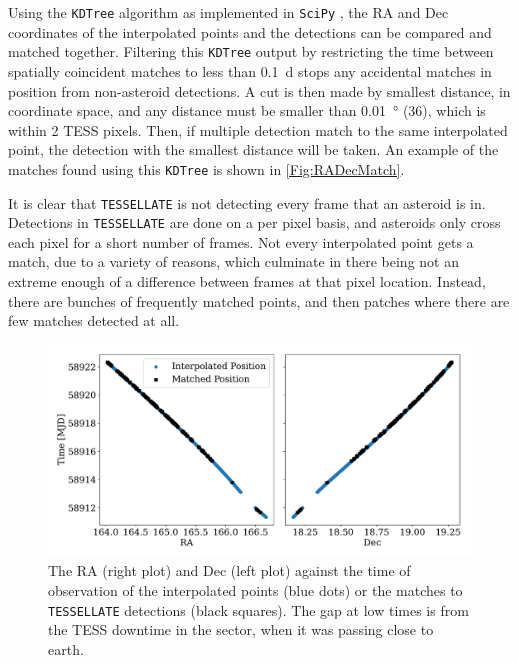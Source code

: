 \documentclass{UCreport}
\begin{document}
Using the \texttt{KDTree} algorithm \citep{Maneewongvatana1999} as implemented in \texttt{SciPy} \citep{2020SciPy-NMeth}, the RA and Dec coordinates of the interpolated points and the detections can be compared and matched together.
Filtering this \texttt{KDTree} output by restricting the time between spatially coincident matches to less than \qty{0.1}{\day} stops any accidental matches in position from non-asteroid detections.
A cut is then made by smallest distance, in coordinate space, and any distance must be smaller than \qty{0.01}{\degree} (\qty{36}{\arcsec}), which is within 2 TESS pixels.
Then, if multiple detection match to the same interpolated point, the detection with the smallest distance will be taken.
An example of the matches found using this \texttt{KDTree} is shown in \autoref{Fig:RADecMatch}.

It is clear that \texttt{TESSELLATE} is not detecting every frame that an asteroid is in.
Detections in \texttt{TESSELLATE} are done on a per pixel basis, and asteroids only cross each pixel for a short number of frames.
Not every interpolated point gets a match, due to a variety of reasons, which culminate in there being not an extreme enough of a difference between frames at that pixel location.
Instead, there are bunches of frequently matched points, and then patches where there are few matches detected at all.


\begin{figure}[]
  \centering
  \includegraphics[width =\textwidth]{../Test Code/Testing Figures/DetectMatchPos.pdf}
  \caption[Interpolated and Detected Positions]{The RA (right plot) and Dec (left plot) against the time of observation of the interpolated points (blue dots) or the matches to \texttt{TESSELLATE} detections (black squares). The gap at low times is from the TESS downtime in the sector, when it was passing close to earth.}
  \label{Fig:RADecMatch}
\end{figure}
\end{document}
